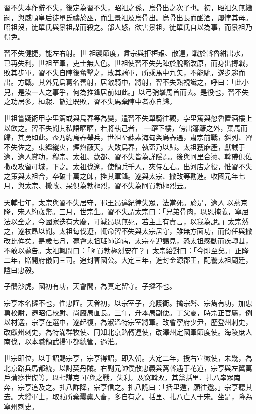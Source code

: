 \begin{pinyinscope}
 習不失本作辭不失，後定為習不失，昭祖之孫，烏骨出之次子也。初，昭祖久無繼嗣，與威順皇后徒單氏禱於巫，而生景祖及烏骨出。烏骨出長而酗酒，屢悖其母。昭祖沒，徒單氏與景祖謀而殺之。部人怒，欲害景祖，徒單氏自以為事，而景祖乃得免。



 習不失健捷，能左右射。世
 祖襲節度，肅宗與拒桓赧、散達，戰於斡魯紺出水，已再失利，世祖至軍，吏士無人色。世祖使習不失先陣於脫豁改原，而身出搏戰，敗其步軍。習不失自陣後奮擊之，敗其騎軍，所乘馬中九矢，不能馳，遂步趨而出。方戰，其外兄烏葛名善射，居敵騎中，將射，習不失熟視識之，呼曰：「此小兒，是汝一人之事乎，何為推鋒居前如此。」以弓弰擊馬首而去。是役也，習不失之功居多。桓赧、散達既敗，習不失馬棄陣中者亦自歸。



 世祖嘗疑術甲孛里篤或與烏春等為變，遣習不失單騎往觀，孛里篤與忽魯置酒樓上以飲之。習不失聞其私語暱暱，若將執己者，
 一躍下樓，傍出籓籬之外，棄馬而歸，其勇如此。盃乃約烏春舉兵，世祖至蘇素海甸與烏春遇，肅宗前戰，斜列、習不失佐之，束縕縱火，煙焰蔽天，大敗烏春，執盃乃以歸。太祖獲麻產，獻馘于遼，遼人賞功，穆宗、太祖、歡都、習不失皆為詳隱焉。後與阿里合懣、斡帶俱佐撒改攻留可城，下之。太祖伐遼，使領兵千人，夾侍左右。出河店之役，惟習不失之策與太祖合，卒破十萬之師，挫其軍鋒。遂與太宗、撒改等勸進。收國元年七月，與太宗、撒改、杲俱為勃極烈，習不失為阿買勃極烈云。



 天輔七年，太宗與習不失居守，鄆王昂違紀律失眾，法當死。於是，遼人
 以燕京降，宋人約歲幣。三月，世宗生。習不失謂太宗曰：「兄弟骨肉，以恩掩義，寧屈法以全之。今國家迭有大慶，可減昂以無死，若主上有責言，以我為說。」太宗然之，遂杖昂以聞。太祖每伐遼，輒命習不失與太宗居守，雖無方面功，而倚任與撒改比侔矣。是歲七月，薨會太祖班師道病，太宗奉迎謁見，恐太祖感動而疾轉甚，不敢以薨告。太祖輒問曰：「阿買勃極烈安在？」太宗紿對曰：「今即至矣。」正隆二年，贈開府儀同三司。追封曹國公。大定三年，進封金源郡王，配饗太祖廟廷，謚曰忠毅。



 子鶻沙虎，國初有功，天會間，為真定留守。子撻不也。



 宗亨本名撻不也，性忠謹。天眷初，以宗室子，充護衛。擒宗磐、宗雋有功，加忠勇校尉，遷昭信校尉、尚廄局直長。三年，升本局副使。丁父憂，時宗正官屬，例以材選，宗亨在選中，遂起復，為淑溫特宗室將軍。改會寧府少尹，歷登州刺史，改獻州刺史，為特滿群牧使、同知北京路轉運使，改澤州定國軍節度使。海陵庶人南伐，以本職領武揚軍都總管，過淮。



 世宗即位，以手詔賜宗亨，宗亨得詔，即入朝。大定二年，授右宣徽使，未幾，為北京路兵馬都統，以討契丹賊。右副元帥僕散忠義與窩斡遇于花道，宗亨與左翼萬戶蒲察世傑等，以七謀克
 軍與之戰，失利。及窩斡敗，其黨括里、扎八率眾南奔，宗亨追及之。扎八詐降，宗亨信之。扎八詭曰：「括里遁，願往邀。」宗亨聽其去。大縱軍士，取賊所棄囊橐人畜，多自有之。括里、扎八亡入于宋。坐是，降為寧州刺史。




\end{pinyinscope}
